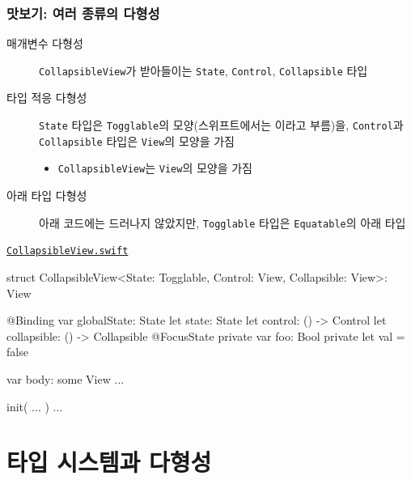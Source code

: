 \documentclass{beamer}
\begin{document}
\begin{frame}[c, fragile]
  \frametitle{맛보기: 여러 종류의 다형성}

  \scriptsize\begin{description}
    \item[매개변수 다형성] \texttt{CollapsibleView}가 받아들이는 \texttt{State}, \texttt{Control}, \texttt{Collapsible} 타입
    \item[타입 적응 다형성] \texttt{State} 타입은 \texttt{Togglable}의 모양(스위프트에서는 이라고 부름)을, \texttt{Control}과 \texttt{Collapsible} 타입은 \texttt{View}의 모양을 가짐
      \begin{itemize}
        \item \texttt{CollapsibleView}는 \texttt{View}의 모양을 가짐
      \end{itemize}
    \item[아래 타입 다형성] 아래 코드에는 드러나지 않았지만, \texttt{Togglable} 타입은 \texttt{Equatable}의 아래 타입
  \end{description}
  \href{https://github.com/snulife/snulife-gp-ios-2/blob/cded38ba6f728bf5429520424a8326ac4cc23a1b/GP/Views/CollapsibleView.swift#L11}{\texttt{CollapsibleView.swift}}
  \begin{swiftcode}
struct CollapsibleView<State: Togglable, Control: View, Collapsible: View>: View {
    @Binding var globalState: State
    let state: State
    let control: () -> Control
    let collapsible: () -> Collapsible
    @FocusState private var foo: Bool
    private let val = false

    var body: some View { ... }

    init( ... ) { ... }
}
  \end{swiftcode}
\end{frame}


\section{타입 시스템과 다형성}
\end{document}
